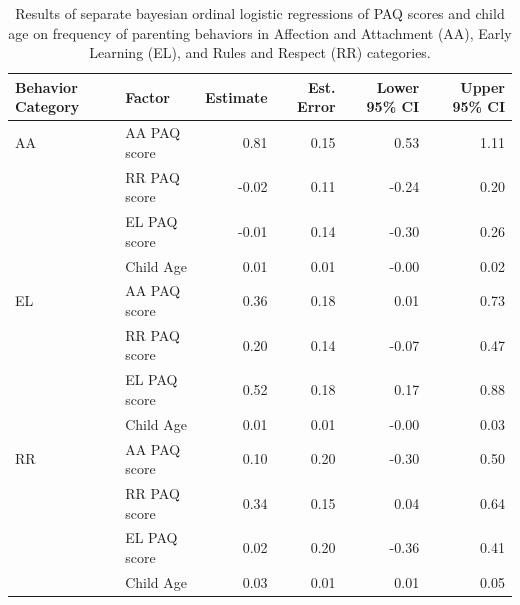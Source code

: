 \documentclass[man]{apa6}
\theoremstyle{definition}
\theoremstyle{definition}
\theoremstyle{definition}
\theoremstyle{remark}
\begin{document}
\begin{table}[h]
\centering
\caption{Results of separate bayesian ordinal logistic regressions of PAQ scores and child age on frequency of parenting behaviors in Affection and Attachment (AA), Early Learning (EL), and Rules and Respect (RR) categories.} 
\label{tab:behavemod}
\begin{tabular}{llrrrr}
  \hline
Behavior Category & Factor & Estimate & Est. Error & Lower 95\% CI & Upper 95\% CI \\ 
  \hline
AA & AA PAQ score & 0.81 & 0.15 & 0.53 & 1.11 \\ 
   & RR PAQ score & -0.02 & 0.11 & -0.24 & 0.20 \\ 
   & EL PAQ score & -0.01 & 0.14 & -0.30 & 0.26 \\ 
   & Child Age & 0.01 & 0.01 & -0.00 & 0.02 \\ 
   \hline
EL & AA PAQ score & 0.36 & 0.18 & 0.01 & 0.73 \\ 
   & RR PAQ score & 0.20 & 0.14 & -0.07 & 0.47 \\ 
   & EL PAQ score & 0.52 & 0.18 & 0.17 & 0.88 \\ 
   & Child Age & 0.01 & 0.01 & -0.00 & 0.03 \\ 
   \hline
RR & AA PAQ score & 0.10 & 0.20 & -0.30 & 0.50 \\ 
   & RR PAQ score & 0.34 & 0.15 & 0.04 & 0.64 \\ 
   & EL PAQ score & 0.02 & 0.20 & -0.36 & 0.41 \\ 
   & Child Age & 0.03 & 0.01 & 0.01 & 0.05 \\ 
   \hline
\end{tabular}
\end{table}
\end{document}
